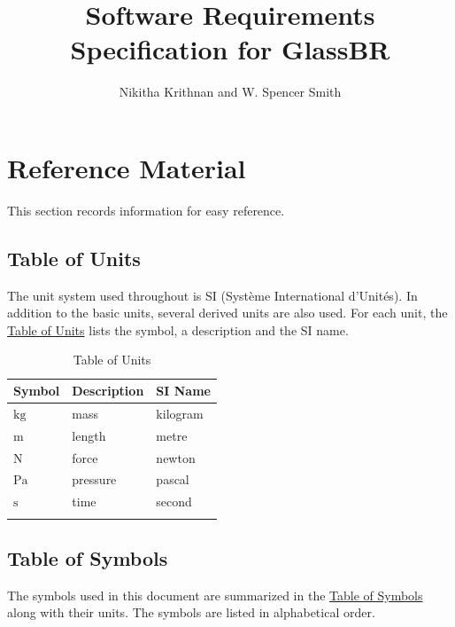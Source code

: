 \documentclass[12pt]{article}
\title{Software Requirements Specification for GlassBR}
\author{Nikitha Krithnan and W. Spencer Smith}
\begin{document}
\maketitle
\tableofcontents
\newpage
\section{Reference Material}
\label{Sec:RefMat}
This section records information for easy reference.

\subsection{Table of Units}
\label{Sec:ToU}
The unit system used throughout is SI (Système International d'Unités). In addition to the basic units, several derived units are also used. For each unit, the \hyperref[Table:ToU]{Table of Units} lists the symbol, a description and the SI name.

\begin{longtable}{l l l}
\toprule
\textbf{Symbol} & \textbf{Description} & \textbf{SI Name}
\\
\midrule
\endhead
${\text{kg}}$ & mass & kilogram
\\
${\text{m}}$ & length & metre
\\
${\text{N}}$ & force & newton
\\
${\text{Pa}}$ & pressure & pascal
\\
${\text{s}}$ & time & second
\\
\bottomrule
\caption{Table of Units}
\label{Table:ToU}
\end{longtable}
\subsection{Table of Symbols}
\label{Sec:ToS}
The symbols used in this document are summarized in the \hyperref[Table:ToS]{Table of Symbols} along with their units. The symbols are listed in alphabetical order.
\end{document}
